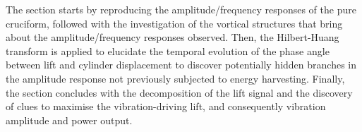 \documentclass[oneside]{utmthesis}
\begin{document}


The section starts by reproducing the amplitude/frequency responses of the pure cruciform, followed with the investigation of the vortical structures that bring about the amplitude/frequency responses observed. Then, the Hilbert-Huang transform is applied to elucidate the temporal evolution of the phase angle between lift and cylinder displacement to discover potentially hidden branches in the amplitude response not previously subjected to energy harvesting. Finally, the section concludes with the decomposition of the lift signal and the discovery of clues to maximise the vibration-driving lift, and consequently vibration amplitude and power output.
\end{document}
